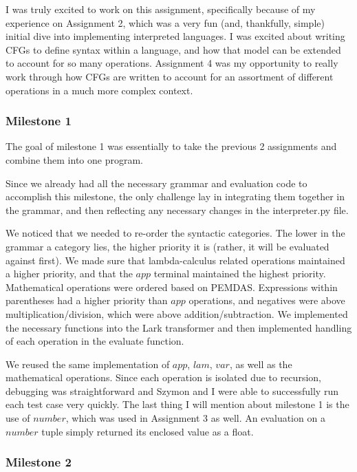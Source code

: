 \documentclass{article}
\theoremstyle{theorem}
\theoremstyle{definition}
\theoremstyle{remark}
\begin{document}
I was truly excited to work on this assignment, specifically because of my experience on Assignment 2, which was a very fun (and, thankfully, simple) initial dive into implementing interpreted languages. I was excited about writing CFGs to define syntax within a language, and how that model can be extended to account for so many operations. Assignment 4 was my opportunity to really work through how CFGs are written to account for an assortment of different operations in a much more complex context.

\subsubsection{Milestone 1}

The goal of milestone 1 was essentially to take the previous 2 assignments and combine them into one program. 

Since we already had all the necessary grammar and evaluation code to accomplish this milestone, the only challenge lay in integrating them together in the grammar, and then reflecting any necessary changes in the interpreter.py file. 

We noticed that we needed to re-order the syntactic categories. The lower in the grammar a category lies, the higher priority it is (rather, it will be evaluated against first). We made sure that lambda-calculus related operations maintained a higher priority, and that the $app$ terminal maintained the highest priority. Mathematical operations were ordered based on PEMDAS. Expressions within parentheses had a higher priority than $app$ operations, and negatives were above multiplication/division, which were above addition/subtraction. We implemented the necessary functions into the Lark transformer and then implemented handling of each operation in the evaluate function.  

We reused the same implementation of $app$, $lam$, $var$, as well as the mathematical operations. Since each operation is isolated due to recursion, debugging was straightforward and Szymon and I were able to successfully run each test case very quickly. The last thing I will mention about milestone 1 is the use of $number$, which was used in Assignment 3 as well. An evaluation on a $number$ tuple simply returned its enclosed value as a float. 

\subsubsection{Milestone 2}
\end{document}
